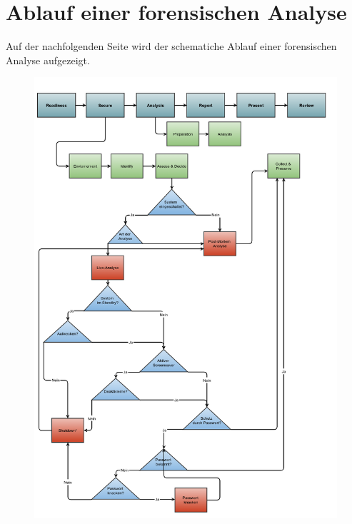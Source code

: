 





\cleardoublepage
\chapter{Ablauf einer forensischen Analyse}
Auf der nachfolgenden Seite wird der schematiche Ablauf einer forensischen Analyse aufgezeigt.
\begin{figure}[!h]
  \centering
  \includegraphics[width=16cm]{./images/AblaufForensischeAnalyse}
\end{figure}

